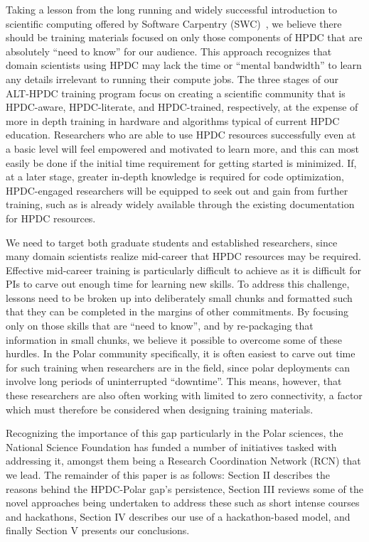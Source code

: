 \documentclass[conference]{IEEEtran}
\begin{document}
Taking a lesson from the long running and widely successful introduction to scientific computing offered by Software Carpentry (SWC)~\cite{Wilson2014-pc}, we believe there should be training materials focused on only those components of HPDC that are absolutely ``need to know'' for our audience. This approach recognizes that domain scientists using HPDC may lack the time or ``mental bandwidth'' to learn any details irrelevant to running their compute jobs. The three stages of our ALT-HPDC training program focus on creating a scientific community that is HPDC-aware, HPDC-literate, and HPDC-trained, respectively, at the expense of more in depth training in hardware and algorithms typical of current HPDC education.  Researchers who are able to use HPDC resources successfully even at a basic level will feel empowered and motivated to learn more, and this can most easily be done if the initial time requirement for getting started is minimized. If, at a later stage, greater in-depth knowledge is required for code optimization, HPDC-engaged researchers will be equipped to seek out and gain from further training, such as is already widely available through the existing documentation for HPDC resources.

We need to target both graduate students and established researchers, since many domain scientists realize mid-career that HPDC resources may be required. Effective mid-career training is particularly difficult to achieve as it is difficult for PIs to carve out enough time for learning new skills. To address this challenge, lessons need to be broken up into deliberately small chunks and formatted such that they can be completed in the margins of other commitments. By focusing only on those skills that are ``need to know'', and by re-packaging that information in small chunks, we believe it possible to overcome some of these hurdles.  In the Polar community specifically, it is often easiest to carve out time for such training when researchers are in the field, since polar deployments can involve long periods of uninterrupted ``downtime''.  This means, however, that these researchers are also often working with limited to zero connectivity, a factor which must therefore be considered when designing training materials.

Recognizing the importance of this gap particularly in the Polar sciences, the National Science Foundation has funded a number of initiatives tasked with addressing it, amongst them being a Research Coordination Network (RCN) that we lead. The remainder of this paper is as follows: Section II describes the reasons behind the HPDC-Polar gap's persistence, Section III reviews some of the novel approaches being undertaken to address these such as short intense courses and hackathons, Section IV describes our use of a hackathon-based model, and finally Section V presents our conclusions.
\end{document}
